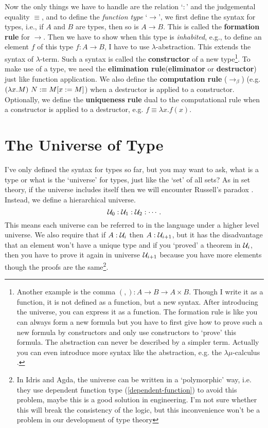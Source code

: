 Now the only things we have to handle are the relation `$:$' and the 
judgemental equality $\equiv$, and to define the {\it function type} 
`$\to$', we first define the syntax for types, i.e., if $A$ and 
$B$ are types, then so is $A\to B$. This is called the {\bf formation 
rule} for $\to$. Then we have to show when this type is {\it inhabited}, 
e.g., to define an element $f$ of this type $f:A\to B$, I have to use 
$\lambda$-abstraction. This extends the syntax of $\lambda$-term. 
Such a syntax is called the {\bf constructor} of a new type\footnote{ 
Another example is the comma $(,): A\to B\to A\times B$. Though I write 
it as a function, it is not defined as a function, but a new syntax. 
After introducing the universe, you can express it as a function. 
The formation rule is like you can always form a new formula but you
have to first give how to prove such a new formula by constructors and
only use constructors to `prove' this formula. The abstraction can never 
be described by a simpler term. Actually you can even introduce more 
syntax like the abstraction, e.g. the $\lambda\mu$-calculus 
\cite{lambda-mu-calculus}.}. To make use of a type, we need the
{\bf elimination rule}({\bf eliminator} or {\bf destructor}) just
like function application. We also define the {\bf computation rule}
($\to_\beta$) (e.g. $(\lambda x. M)\ N :\equiv M[x:=M]$) when a destructor 
is applied to a constructor. Optionally, we define the {\bf uniqueness rule}
dual to the computational rule when a constructor is applied to a
destructor, e.g. $f\equiv\lambda x. f(x)$.

\section{The Universe of Type}
\label{type-universe}
I've only defined the syntax for types so far, but you may want to
ask, what is a type or what is the `universe' for types, just like the 
`set' of all sets? As in set theory, if the universe includes itself then
we will encounter Russell's paradox \cite{the-paradox-of-trees-in-type-theory}.
Instead, we define a hierarchical universe.
$$
    \mathcal{U}_0: \mathcal{U}_1: \mathcal{U}_2: \cdots.
$$
This means each universe can be referred to in the language under a higher
level universe. We also require that if $A: \mathcal{U}_i$ then 
$A: \mathcal{U}_{i+1}$, but it has the disadvantage that an element won't
have a unique type and if you `proved' a theorem in $\mathcal{U}_i$,
then you have to prove it again in universe $\mathcal{U}_{i+1}$ because
you have more elements though the proofs are the same\footnote{In Idris
and Agda, the universe can be written in a `polymorphic' way, i.e. they
use dependent function type (\autoref{dependent-function}) to avoid this problem, maybe
this is a good solution in engineering. I'm not sure whether this will break
the consistency of the logic, but this inconvenience won't be a problem
in our development of type theory}. 

